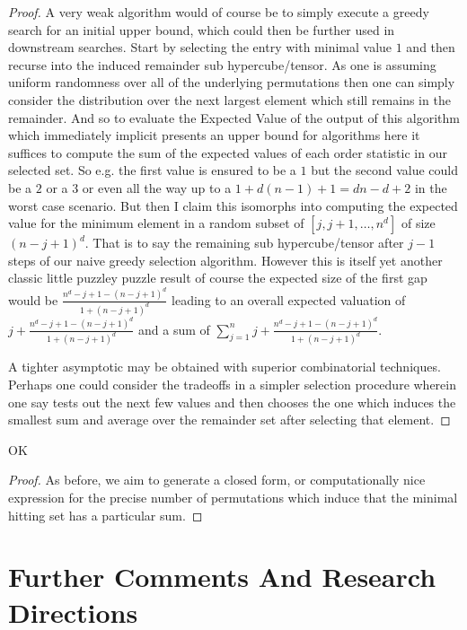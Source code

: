 \documentclass[12pt]{article}
\begin{document}
\begin{proof}
	A very weak algorithm would of course be to simply execute a greedy search for an initial upper bound, which could then be further used in downstream searches. Start by selecting the entry with minimal value $1$ and then recurse into the induced remainder sub hypercube/tensor. As one is assuming uniform randomness over all of the underlying permutations then one can simply consider the distribution over the next largest element which still remains in the remainder. And so to evaluate the Expected Value of the output of this algorithm which immediately implicit presents an upper bound for algorithms here it suffices to compute the sum of the expected values of each order statistic in our selected set. So e.g. the first value is ensured to be a $1$ but the second value could be a $2$ or a $3$ or even all the way up to a $1 + d (n-1) + 1 = dn - d + 2$ in the worst case scenario. But then I claim this isomorphs into computing the expected value for the minimum element in a random subset of $[j,j+1,\dots,n^d]$ of size $(n-j+1)^d$. That is to say the remaining sub hypercube/tensor after $j-1$ steps of our naive greedy selection algorithm. However this is itself yet another classic little puzzley puzzle result of course the expected size of the first gap would be $\frac{n^d-j+1-(n-j+1)^d}{1+(n-j+1)^d}$ leading to an overall expected valuation of $j+\frac{n^d-j+1-(n-j+1)^d}{1+(n-j+1)^d}$ and a sum of $\sum_{j=1}^n j+\frac{n^d-j+1-(n-j+1)^d}{1+(n-j+1)^d}$.

	A tighter asymptotic may be obtained with superior combinatorial techniques. Perhaps one could consider the tradeoffs in a simpler selection procedure wherein one say tests out the next few values and then chooses the one which induces the smallest sum and average over the remainder set after selecting that element.
\end{proof}

\begin{theorem}\label{Thm:Minimum Sum Distribution}
	OK
\end{theorem}

\begin{proof}
	As before, we aim to generate a closed form, or computationally nice expression for the precise number of permutations which induce that the minimal hitting set has a particular sum.
\end{proof}

\section{Further Comments And Research Directions}
\end{document}
